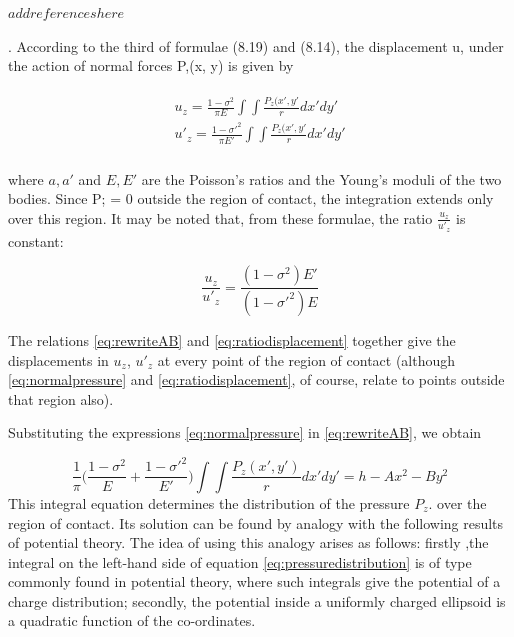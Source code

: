  $add references here$

. According to the third of formulae (8.19) and (8.14), the
displacement u, under the action of normal forces P,(x, y) is given by

\begin{align}
\begin{split}
u_{z} = \frac{1-\sigma^{2}}{\pi E}\int\int\frac{P_{z}(x',y'}{r}dx'dy' \\
u'_{z} = \frac{1-\sigma'^{2}}{\pi E'}\int\int\frac{P_{z}(x',y'}{r}dx'dy' \\
\end{split}
\label{eq:normalpressure}
\end{align}

where $a, a'$ and $E, E'$ are the Poisson’s ratios and the Young’s moduli of the two bodies. Since P; = 0 outside the region of contact, the integration extends only over this region. It may be noted that, from these formulae, the ratio $\frac{u_{z}}{u'_{z}}$ is constant:

\begin{equation}
\frac{u_{z}}{u'_{z}} = \frac{(1-\sigma^{2})E'}{(1-\sigma'^{2})E}
\label{eq:ratiodisplacement}
\end{equation}

The relations \ref{eq:rewriteAB} and \ref{eq:ratiodisplacement} together give the displacements in $u_{z}$, $u'_{z}$ at every point of the region of contact (although \ref{eq:normalpressure} and \ref{eq:ratiodisplacement}, of course, relate to
points outside that region also).

Substituting the expressions \ref{eq:normalpressure} in \ref{eq:rewriteAB}, we obtain

\begin{equation}
\frac{1}{\pi}\Big(\frac{1-\sigma^{2}}{E}+\frac{1-\sigma'^{2}}{E'}\Big)\int\int\frac{P_{z}(x',y')}{r}dx'dy' = h-Ax^{2}-By^{2}
\label{eq:pressuredistribution}
\end{equation}
This integral equation determines the distribution of the pressure $P_{z}$. over the region of contact. Its solution can be found by analogy with the following results of potential theory. The idea of using this analogy arises as follows:
firstly ,the integral on the left-hand side of equation \ref{eq:pressuredistribution} is of type commonly found in potential theory, where such integrals give the potential of a
charge distribution; secondly, the potential inside a uniformly charged ellipsoid is a quadratic function of the co-ordinates.


